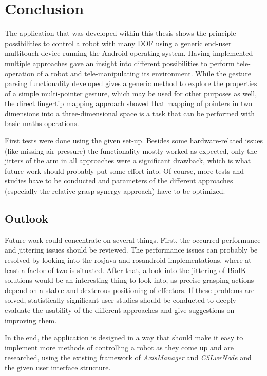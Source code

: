 \chapter{Conclusion}
\label{chap:concl}

The application that was developed within this thesis shows the principle possibilities to control a robot with many DOF using a generic end-user multitouch device running the Android operating system. Having implemented multiple approaches gave an insight into different possibilities to perform tele-operation of a robot and  tele-manipulating its environment. While the gesture parsing functionality developed gives a generic method to explore the properties of a simple multi-pointer gesture, which may be used for other purposes as well, the direct fingertip mapping approach showed that mapping of pointers in two dimensions into a three-dimensional space is a task that can be performed with basic maths operations.

First tests were done using the given set-up. Besides some hardware-related issues (like missing air pressure) the functionality mostly worked as expected, only the jitters of the arm in all approaches were a significant drawback, which is what future work should probably put some effort into. Of course, more tests and studies have to be conducted and parameters of the different approaches (especially the relative grasp synergy approach) have to be optimized.

\section{Outlook}

Future work could concentrate on several things. First, the occurred performance and jittering issues should be reviewed. The performance issues can probably be resolved by looking into the rosjava and rosandroid implementations, where at least a factor of two is situated. After that, a look into the jittering of BioIK solutions would be an interesting thing to look into, as precise grasping actions depend on a stable and dexterous positioning of effectors. If these problems are solved, statistically significant user studies should be conducted to deeply evaluate the usability of the different approaches and give suggestions on improving them.

In the end, the application is designed in a way that should make it easy to implement more methods of controlling a robot as they come up and are researched, using the existing framework of \textit{AxisManager} and \textit{C5LwrNode} and the given user interface structure.